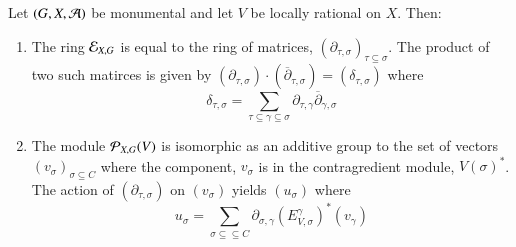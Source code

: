 \begin{prop}\label{art6-proposition-15.2}
Let $(G, X, \mathcal{A})$ be monumental and let $V$ be locally rational on $X$. Then:
\begin{enumerate}[(1)]
\item The ring $\mathcal{E}_{X, G}$ is equal to the ring of matrices, $(\partial_{\tau, \sigma})_{\tau \subseteq \sigma}$. The product of two such matirces is given by $(\partial_{\tau, \sigma}) \cdot (\overline{\partial}_{\tau, \sigma}) = (\delta_{\tau,\sigma})$ where\label{art6-proposition15.2-enum-1}
$$
\delta_{\tau, \sigma} = \sum\limits_{\tau \subseteq \gamma \subseteq \sigma}\partial_{\tau, \gamma}\overline{\partial}_{\gamma, \sigma}
$$

\item The module $\mathcal{P}_{X, G}(V)$ is isomorphic as an additive group to the set of vectors $(v_{\sigma})_{\sigma \subseteq C}$ where the component, $v_{\sigma}$ is in the contragredient module, $V(\sigma)^{*}$. The action of $(\partial_{\tau, \sigma})$ on $(v_{\sigma})$ yields $(u_{\sigma})$ where\label{art6-proposition15.2-enum-2}
$$
u_{\sigma} = \sum\limits_{\sigma \subseteq \subseteq C} \partial_{\sigma, \gamma}(E_{V, \sigma}^{\gamma})^{*}(v_{\gamma})
$$
\end{enumerate}
\end{prop}

